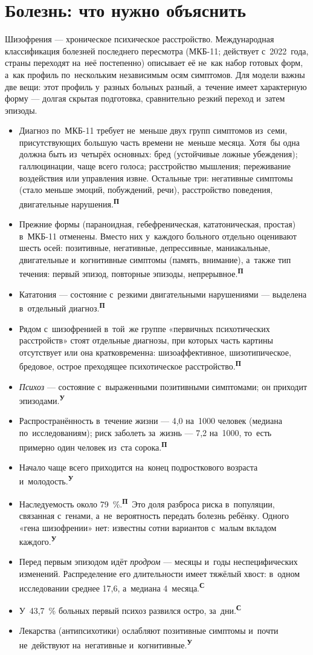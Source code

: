 \documentclass[11pt,a4paper,landscape,twocolumn]{article}
\newcommand{\tU}{\textsuperscript{\sffamily\bfseries\color{cM}У}}
\newcommand{\tS}{\textsuperscript{\sffamily\bfseries\color{cB}С}}
\newcommand{\tP}{\textsuperscript{\sffamily\bfseries\color{cA}П}}
\newcommand{\facts}{\par\vspace{3pt}{\sffamily\bfseries\small\color{cM}Опорные факты}\par\vspace{-2pt}}
\begin{document}
\section{Болезнь: что нужно объяснить}
Шизофрения — хроническое психическое расстройство. Международная классификация болезней последнего пересмотра (МКБ-11; действует с~2022~года, страны переходят на~неё постепенно) описывает её не~как набор готовых форм, а~как профиль по~нескольким независимым осям симптомов. Для модели важны две вещи: этот профиль у~разных больных разный, а~течение имеет характерную форму — долгая скрытая подготовка, сравнительно резкий переход и~затем эпизоды.
\facts
\begin{itemize}
\item Диагноз по~МКБ-11 требует не~меньше двух групп симптомов из~семи, присутствующих большую часть времени не~меньше месяца. Хотя~бы одна должна быть из~четырёх основных: бред (устойчивые ложные убеждения); галлюцинации, чаще всего голоса; расстройство мышления; переживание воздействия или управления извне. Остальные три: негативные симптомы (стало меньше эмоций, побуждений, речи), расстройство поведения, двигательные нарушения.\tP
\item Прежние формы (параноидная, гебефреническая, кататоническая, простая) в~МКБ-11 отменены. Вместо них у~каждого больного отдельно оценивают шесть осей: позитивные, негативные, депрессивные, маниакальные, двигательные и~когнитивные симптомы (память, внимание), а~также тип течения: первый эпизод, повторные эпизоды, непрерывное.\tP
\item Кататония — состояние с~резкими двигательными нарушениями — выделена в~отдельный диагноз.\tP
\item Рядом с~шизофренией в~той~же группе «первичных психотических расстройств» стоят отдельные диагнозы, при которых часть картины отсутствует или она кратковременна: шизоаффективное, шизотипическое, бредовое, острое преходящее психотическое расстройство.\tP
\item \emph{Психоз} — состояние с~выраженными позитивными симптомами; он приходит эпизодами.\tU
\item Распространённость в~течение жизни — 4,0 на~1000 человек (медиана по~исследованиям); риск заболеть за~жизнь — 7,2 на~1000, то~есть примерно один человек из~ста сорока.\tP
\item Начало чаще всего приходится на~конец подросткового возраста и~молодость.\tU
\item Наследуемость около 79~\%.\tP\ Это доля разброса риска в~популяции, связанная с~генами, а~не~вероятность передать болезнь ребёнку. Одного «гена шизофрении» нет: известны сотни вариантов с~малым вкладом каждого.\tU
\item Перед первым эпизодом идёт \emph{продром} — месяцы и~годы неспецифических изменений. Распределение его длительности имеет тяжёлый хвост: в~одном исследовании среднее 17,6, а~медиана 4~месяца.\tS
\item У~43,7~\% больных первый психоз развился остро, за~дни.\tS
\item Лекарства (антипсихотики) ослабляют позитивные симптомы и~почти не~действуют на~негативные и~когнитивные.\tU
\end{itemize}
\end{document}
